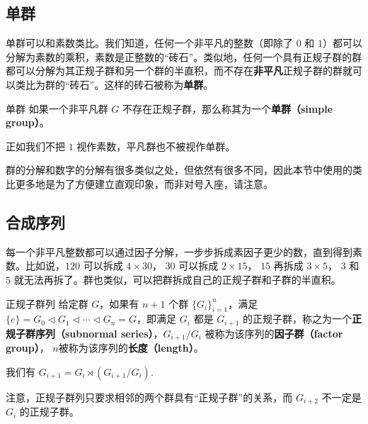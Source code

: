 

\subsection{单群}

单群可以和素数类比。我们知道，任何一个非平凡的整数（即除了 $0$ 和 $1$）都可以分解为素数的乘积，素数是正整数的“砖石”。类似地，任何一个具有正规子群的群都可以分解为其正规子群和另一个群的半直积，而不存在\textbf{非平凡}正规子群的群就可以类比为群的“砖石”。这样的砖石被称为\textbf{单群}。

\begin{definition}{单群}
如果一个非平凡群 $G$ 不存在正规子群，那么称其为一个\textbf{单群（simple group）}。
\end{definition}

正如我们不把 $1$ 视作素数，平凡群也不被视作单群。 

群的分解和数字的分解有很多类似之处，但依然有很多不同，因此本节中使用的类比更多地是为了方便建立直观印象，而非对号入座，请注意。

\subsection{合成序列}

每一个非平凡整数都可以通过因子分解，一步步拆成素因子更少的数，直到得到素数。比如说，$120$ 可以拆成 $4 \times 30$， $30$ 可以拆成 $2 \times 15$， $15$ 再拆成 $3 \times 5$， $3$ 和 $5$ 就无法再拆了。群也类似，可以把群拆成自己的正规子群和子群的半直积。

\begin{definition}{正规子群列}
给定群 $G$，如果有 $n+1$ 个群 $\{G_i\}_{i = 1}^n$，满足 $\{e\} = G_0 \triangleleft G_1 \triangleleft \cdots \triangleleft G_n = G$，即满足 $G_{i}$ 都是 $G_{i+1}$ 的正规子群，称之为一个\textbf{正规子群序列（subnormal series）}，$G_{i+1} / G_{i}$ 被称为该序列的\textbf{因子群（factor group）}， $n$被称为该序列的\textbf{长度（length）}。
\end{definition}

我们有 $G_{i + 1} = G_{i} \rtimes (G_{i+1} / G_{i})$.


注意，正规子群列只要求相邻的两个群具有“正规子群”的关系，而 $G_{i+2}$ 不一定是 $G_i$ 的正规子群。

